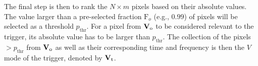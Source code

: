 \documentclass[aps,twocolumn,showpacs,groupedaddress, nofootinbib]{revtex4}  %
\begin{document}
The final step is then to rank the  $N\times m$ pixels based on their absolute values. 
The value larger than a pre-selected fraction $\text{F}_o$ (e.g., $0.99$) of pixels will be selected as a threshold $p_\text{thr}$.
For a pixel from $\bold{V}_\text{o}$ to be considered relevant to the trigger, its absolute value has to be larger than $p_\text{thr}$.
The collection of the pixels $> p_\text{thr}$ from $\bold{V}_\text{o}$ as well as their corresponding time and frequency 
is then the $V$ mode of the trigger, denoted by $\bold{V}_\text{t}$.
\end{document}
